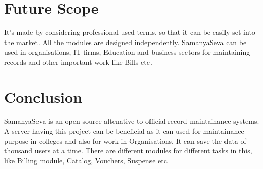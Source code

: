 \section{Future Scope}
It's made by considering professional used terms, so that it can be easily set into the market.
All the modules are designed independently. SamanyaSeva can be used in organisations, IT firms, Education and business sectors for maintaining records and other important work like Bills etc.

\section{Conclusion}
SamanyaSeva is an open source altenative to official record maintainance systems. A server having this project
can be beneficial as it can used for maintainance purpose in colleges and also for work in Organisations.
It can save the data of thousand users at a time. There are different modules for different tasks in this, like Billing module, Catalog, Vouchers, Suspense etc.

\newpage
